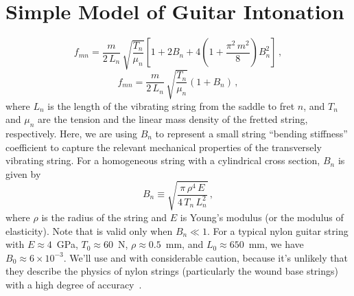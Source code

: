 %
%
%

 \section{Simple Model of Guitar Intonation\label{sct:model}}

 \begin{equation}
f_{m n} = \frac{m}{2\, L_n}\, \sqrt{\frac{T_n}{\mu_n}} \left[ 1 + 2 B_n + 4 \left(1 + \frac{\pi^2\, m^2}{8}\right) B_n^2 \right]\, ,
 \end{equation}
 \begin{equation} \label{eqn:f_mn_stiff}
f_{m n} = \frac{m}{2\, L_n}\, \sqrt{\frac{T_n}{\mu_n}} \left( 1 + B_n \right)\, ,
 \end{equation}
where $L_n$ is the length of the vibrating string from the saddle to fret $n$, and $T_n$ and $\mu_n$ are the tension and the linear mass density of the fretted string, respectively. Here, we are using $B_n$ to represent a small string ``bending stiffness'' coefficient to capture the relevant mechanical properties of the transversely vibrating string. For a homogeneous string with a cylindrical cross section, $B_n$ is given by
 \begin{equation} \label{eqn:b_n_def}
B_n \equiv \sqrt{\frac{\pi\, \rho^4\, E}{4\, T_n\, L_n^2}}\, ,
 \end{equation}
where $\rho$ is the radius of the string and $E$ is Young's modulus (or the modulus of elasticity). Note that  is valid only when $B_n \ll 1$. For a typical nylon guitar string with $E \approx 4$~GPa, $T_0 \approx 60$~N, $\rho \approx 0.5$~mm, and $L_0 \approx 650$~mm, we have $B_0 \approx 6 \times 10^{-3}$. We'll use  and  with considerable caution, because it's unlikely that they describe the physics of nylon strings (particularly the wound base strings) with a high degree of accuracy~\cite{ref:lynchaird2017mpn}.

